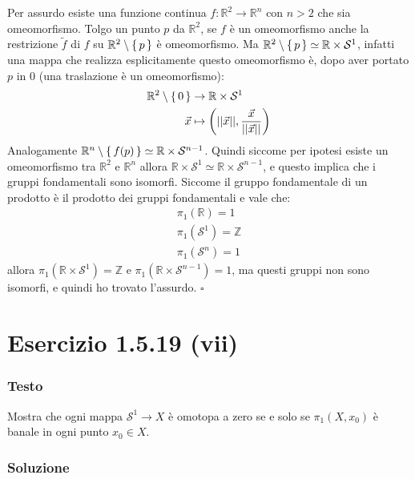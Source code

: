 \documentclass[10pt, toc=sectionentrywithdots]{scrartcl}
\newcommand{\Z}{\mathbb{Z}}
\newcommand{\Sph}[1][]{\mathcal{S}^#1}
\begin{document}
Per assurdo esiste una funzione continua
$ f \colon \mathbb{R}^2 \to \mathbb{R}^n $ con $ n > 2 $ che sia omeomorfismo. Tolgo un
punto $ p $ da $ \mathbb{R}^2 $, se $ f $ è un omeomorfismo anche la restrizione
$ \tilde{f} $ di $ f $ su $ \mathbb{R}^2 \setminus \set{p} $ è omeomorfismo. Ma
$ \mathbb{R}^{2} \setminus \set{p} \simeq \mathbb{R} \times \mathcal{S}^1 $, infatti una mappa che
realizza esplicitamente questo omeomorfismo è, dopo aver portato $ p $ in $ 0 $
(una traslazione è un omeomorfismo):
\begin{align*}
  \mathbb{R}^{2} \setminus \set{0} & \to \mathbb{R} \times \mathcal{S}^1 \\
  \vec{x} & \mapsto \left( || \vec{x} ||, \frac{\vec{x}}{|| \vec{x} ||} \right)
\end{align*}
Analogamente
$ \mathbb{R}^{n} \setminus \set{f(p)} \simeq \mathbb{R} \times \Sph{n-1} $. Quindi siccome per
ipotesi esiste un omeomorfismo tra $ \mathbb{R}^{2} $ e $ \mathbb{R}^{n} $
allora $ \mathbb{R} \times \Sph{1} \simeq \mathbb{R} \times \Sph{n-1} $, e questo implica che i
gruppi fondamentali sono isomorfi. Siccome il gruppo fondamentale di un prodotto
è il prodotto dei gruppi fondamentali e vale che:
\begin{gather*}
  \pi_1(\mathbb{R}) = 1 \\
  \pi_1(\Sph{1}) = \Z \\
  \pi_1(\Sph{n}) = 1
\end{gather*}
allora $ \pi_1 (\mathbb{R} \times \Sph{1}) = \Z $ e $ \pi_1(\mathbb{R} \times \Sph{n-1}) = 1 $, ma
questi gruppi non sono isomorfi, e quindi ho trovato l'assurdo.
\hfill $ \square $


\section[1.5.19 (vii)]{Esercizio 1.5.19 (vii)}

\subsubsection*{Testo}

Mostra che ogni mappa $ \Sph{1} \to X $ è omotopa a zero se e solo se $ \pi_1(X, x_0) $
è banale in ogni punto $ x_0 \in X $.

\subsubsection*{Soluzione}
\end{document}
